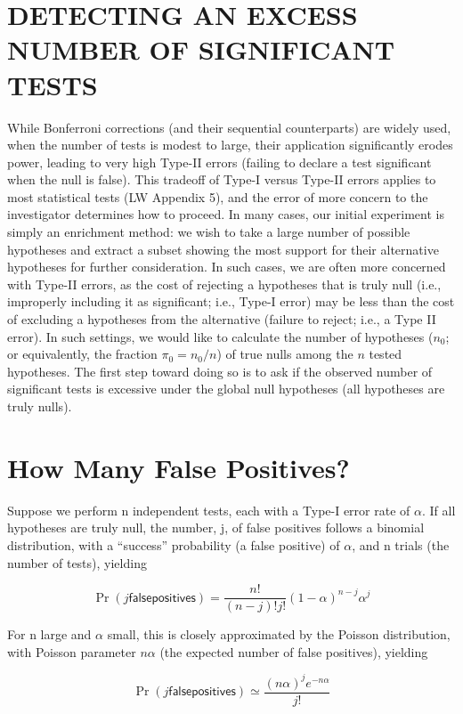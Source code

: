 \documentclass{article}
\begin{document}
\section{DETECTING AN EXCESS NUMBER OF SIGNIFICANT TESTS}
While Bonferroni corrections (and their sequential counterparts) are widely used, when the number of tests is modest to large, their application significantly erodes power, leading to very high Type-II errors (failing to declare a test significant when the null is false). This tradeoff of Type-I versus Type-II errors applies to most statistical tests (LW Appendix 5), and the error of more concern to the investigator determines how to proceed. In many cases, our initial experiment is simply an enrichment method: we wish to take a large number of possible hypotheses and extract a subset showing the most support for their alternative hypotheses for further consideration. In such cases, we are often more concerned with Type-II errors, as the cost of rejecting a hypotheses that is truly null (i.e., improperly including it as significant; i.e., Type-I error) may be less than the cost of excluding a hypotheses from the alternative (failure to reject; i.e., a Type II error). In such settings, we would like to calculate the number of hypotheses ($n_0$; or equivalently, the fraction $\pi_0 = n_0/n$) of true nulls among the $n$ tested hypotheses. The first step toward doing so is to ask if the observed number of significant tests is excessive under the global null hypotheses (all hypotheses are truly nulls).

\section{How Many False Positives?}
Suppose we perform n independent tests, each with a Type-I error rate of  $ \alpha $. If all hypotheses are truly null, the number, j, of false positives follows a binomial distribution, with a “success” probability (a false positive) of  $ \alpha $, and n trials (the number of tests), yielding

\begin{equation}
\Pr(j\mathsf{f a l s e p o s i t i v e s})=\frac{n!}{(n-j)!j!}(1-\alpha)^{n-j}\alpha^{j}
\end{equation}

For n large and  $ \alpha $ small, this is closely approximated by the Poisson distribution, with Poisson parameter  $ n\alpha $ (the expected number of false positives), yielding

\begin{equation}
\Pr(j\mathsf{f a l s e p o s i t i v e s})\simeq\frac{(n\alpha)^{j}e^{-n\alpha}}{j!}
\end{equation}
\end{document}
